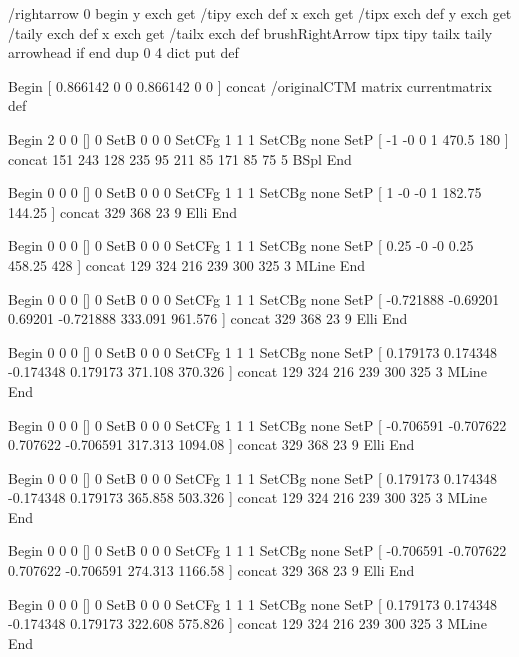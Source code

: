 /rightarrow {
0 begin
y exch get /tipy exch def
x exch get /tipx exch def
y exch get /taily exch def
x exch get /tailx exch def
brushRightArrow { tipx tipy tailx taily arrowhead } if
end
} dup 0 4 dict put def




Begin
[ 0.866142 0 0 0.866142 0 0 ] concat
/originalCTM matrix currentmatrix def

Begin %
2 0 0 [] 0 SetB
0 0 0 SetCFg
1 1 1 SetCBg
none SetP %
[ -1 -0 0 1 470.5 180 ] concat
151 243
128 235
95 211
85 171
85 75
5 BSpl
End

Begin %
0 0 0 [] 0 SetB
0 0 0 SetCFg
1 1 1 SetCBg
none SetP %
[ 1 -0 -0 1 182.75 144.25 ] concat
329 368 23 9 Elli
End

Begin %
0 0 0 [] 0 SetB
0 0 0 SetCFg
1 1 1 SetCBg
none SetP %
[ 0.25 -0 -0 0.25 458.25 428 ] concat
129 324
216 239
300 325
3 MLine
End

Begin %
0 0 0 [] 0 SetB
0 0 0 SetCFg
1 1 1 SetCBg
none SetP %
[ -0.721888 -0.69201 0.69201 -0.721888 333.091 961.576 ] concat
329 368 23 9 Elli
End

Begin %
0 0 0 [] 0 SetB
0 0 0 SetCFg
1 1 1 SetCBg
none SetP %
[ 0.179173 0.174348 -0.174348 0.179173 371.108 370.326 ] concat
129 324
216 239
300 325
3 MLine
End

Begin %
0 0 0 [] 0 SetB
0 0 0 SetCFg
1 1 1 SetCBg
none SetP %
[ -0.706591 -0.707622 0.707622 -0.706591 317.313 1094.08 ] concat
329 368 23 9 Elli
End

Begin %
0 0 0 [] 0 SetB
0 0 0 SetCFg
1 1 1 SetCBg
none SetP %
[ 0.179173 0.174348 -0.174348 0.179173 365.858 503.326 ] concat
129 324
216 239
300 325
3 MLine
End

Begin %
0 0 0 [] 0 SetB
0 0 0 SetCFg
1 1 1 SetCBg
none SetP %
[ -0.706591 -0.707622 0.707622 -0.706591 274.313 1166.58 ] concat
329 368 23 9 Elli
End

Begin %
0 0 0 [] 0 SetB
0 0 0 SetCFg
1 1 1 SetCBg
none SetP %
[ 0.179173 0.174348 -0.174348 0.179173 322.608 575.826 ] concat
129 324
216 239
300 325
3 MLine
End


